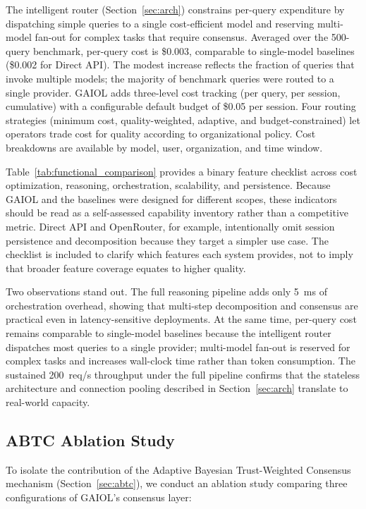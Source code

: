 \documentclass{iopjournal}
\begin{document}
The intelligent router (Section~\ref{sec:arch}) constrains per-query expenditure by dispatching simple queries to a single cost-efficient model and reserving multi-model fan-out for complex tasks that require consensus. Averaged over the 500-query benchmark, per-query cost is \$0.003, comparable to single-model baselines (\$0.002 for Direct API). The modest increase reflects the fraction of queries that invoke multiple models; the majority of benchmark queries were routed to a single provider. GAIOL adds three-level cost tracking (per query, per session, cumulative) with a configurable default budget of \$0.05 per session. Four routing strategies (minimum cost, quality-weighted, adaptive, and budget-constrained) let operators trade cost for quality according to organizational policy. Cost breakdowns are available by model, user, organization, and time window.

Table~\ref{tab:functional_comparison} provides a binary feature checklist across cost optimization, reasoning, orchestration, scalability, and persistence. Because GAIOL and the baselines were designed for different scopes, these indicators should be read as a self-assessed capability inventory rather than a competitive metric. Direct API and OpenRouter, for example, intentionally omit session persistence and decomposition because they target a simpler use case. The checklist is included to clarify which features each system provides, not to imply that broader feature coverage equates to higher quality.

Two observations stand out. The full reasoning pipeline adds only 5~ms of orchestration overhead, showing that multi-step decomposition and consensus are practical even in latency-sensitive deployments. At the same time, per-query cost remains comparable to single-model baselines because the intelligent router dispatches most queries to a single provider; multi-model fan-out is reserved for complex tasks and increases wall-clock time rather than token consumption. The sustained 200~req/s throughput under the full pipeline confirms that the stateless architecture and connection pooling described in Section~\ref{sec:arch} translate to real-world capacity.

\subsection{ABTC Ablation Study}
\label{sec:abtc_ablation}

To isolate the contribution of the Adaptive Bayesian Trust-Weighted Consensus mechanism (Section~\ref{sec:abtc}), we conduct an ablation study comparing three configurations of GAIOL's consensus layer:
\end{document}
